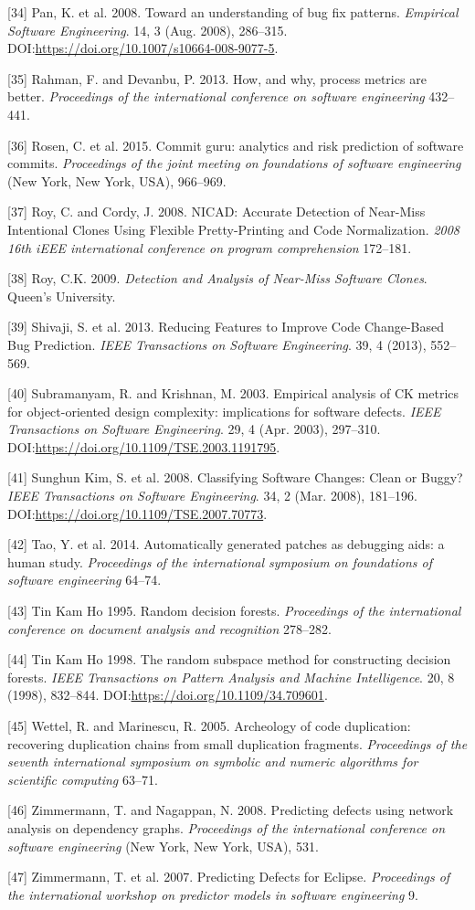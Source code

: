 \documentclass[sigconf]{acmart}
\begin{document}
\hypertarget{ref-Pan2008}{}
[34] Pan, K. et al. 2008. Toward an understanding of bug fix
patterns. \emph{Empirical Software Engineering}. 14, 3 (Aug. 2008),
286--315. DOI:\url{https://doi.org/10.1007/s10664-008-9077-5}.

[35] Rahman, F. and Devanbu, P. 2013. How, and why, process metrics
are better. \emph{Proceedings of the international conference on
software engineering} 432--441.

[36] Rosen, C. et al. 2015. Commit guru: analytics and risk
prediction of software commits. \emph{Proceedings of the joint meeting
on foundations of software engineering} (New York, New York, USA),
966--969.

[37] Roy, C. and Cordy, J. 2008. NICAD: Accurate Detection of
Near-Miss Intentional Clones Using Flexible Pretty-Printing and Code
Normalization. \emph{2008 16th iEEE international conference on program
comprehension} 172--181.

[38] Roy, C.K. 2009. \emph{Detection and Analysis of Near-Miss
Software Clones}. Queen's University.

[39] Shivaji, S. et al. 2013. Reducing Features to Improve Code
Change-Based Bug Prediction. \emph{IEEE Transactions on Software
Engineering}. 39, 4 (2013), 552--569.

[40] Subramanyam, R. and Krishnan, M. 2003. Empirical analysis of CK
metrics for object-oriented design complexity: implications for software
defects. \emph{IEEE Transactions on Software Engineering}. 29, 4 (Apr.
2003), 297--310. DOI:\url{https://doi.org/10.1109/TSE.2003.1191795}.

[41] Sunghun Kim, S. et al. 2008. Classifying Software Changes:
Clean or Buggy? \emph{IEEE Transactions on Software Engineering}. 34, 2
(Mar. 2008), 181--196. DOI:\url{https://doi.org/10.1109/TSE.2007.70773}.

[42] Tao, Y. et al. 2014. Automatically generated patches as
debugging aids: a human study. \emph{Proceedings of the international
symposium on foundations of software engineering} 64--74.

[43] Tin Kam Ho 1995. Random decision forests. \emph{Proceedings of
the international conference on document analysis and recognition}
278--282.

[44] Tin Kam Ho 1998. The random subspace method for constructing
decision forests. \emph{IEEE Transactions on Pattern Analysis and
Machine Intelligence}. 20, 8 (1998), 832--844.
DOI:\url{https://doi.org/10.1109/34.709601}.

[45] Wettel, R. and Marinescu, R. 2005. Archeology of code
duplication: recovering duplication chains from small duplication
fragments. \emph{Proceedings of the seventh international symposium on
symbolic and numeric algorithms for scientific computing} 63--71.

[46] Zimmermann, T. and Nagappan, N. 2008. Predicting defects using
network analysis on dependency graphs. \emph{Proceedings of the
international conference on software engineering} (New York, New York,
USA), 531.

[47] Zimmermann, T. et al. 2007. Predicting Defects for Eclipse.
\emph{Proceedings of the international workshop on predictor models in
software engineering} 9.
\end{document}

